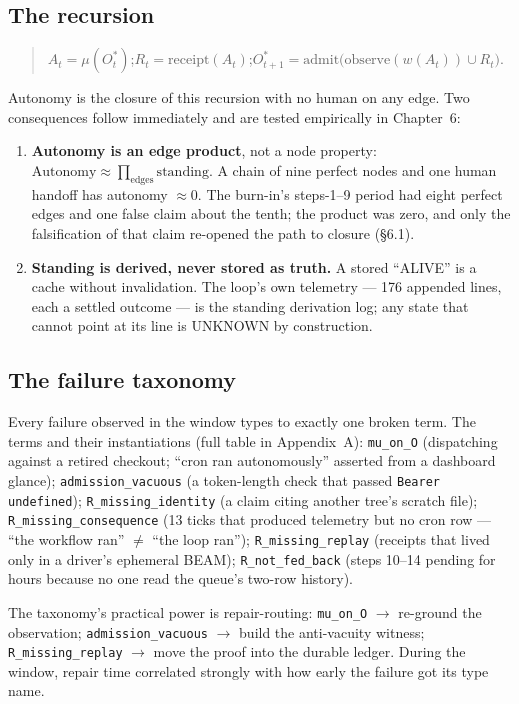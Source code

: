 \documentclass[11pt,a4paper]{article}
\theoremstyle{remark}
\newcommand{\term}[1]{\texttt{#1}}
\begin{document}
\subsection{The recursion}
\begin{quote}
$A_t = \mu(O^{*}_t)$;\qquad $R_t = \mathrm{receipt}(A_t)$;\qquad $O^{*}_{t+1} = \mathrm{admit}\big(\mathrm{observe}(w(A_t)) \cup R_t\big)$.
\end{quote}
Autonomy is the closure of this recursion with no human on any edge. Two consequences follow immediately and are tested empirically in Chapter~6:
\begin{enumerate}
\item \textbf{Autonomy is an edge product}, not a node property: $\mathrm{Autonomy} \approx \prod_{\mathrm{edges}} \mathrm{standing}$. A chain of nine perfect nodes and one human handoff has autonomy $\approx 0$. The burn-in's steps-1--9 period had eight perfect edges and one false claim about the tenth; the product was zero, and only the falsification of that claim re-opened the path to closure (\S6.1).
\item \textbf{Standing is derived, never stored as truth.} A stored ``ALIVE'' is a cache without invalidation. The loop's own telemetry --- 176 appended lines, each a settled outcome --- is the standing derivation log; any state that cannot point at its line is UNKNOWN by construction.
\end{enumerate}

\subsection{The failure taxonomy}
Every failure observed in the window types to exactly one broken term. The terms and their instantiations (full table in Appendix~A): \term{mu\_on\_O} (dispatching against a retired checkout; ``cron ran autonomously'' asserted from a dashboard glance); \term{admission\_vacuous} (a token-length check that passed \term{Bearer undefined}); \term{R\_missing\_identity} (a claim citing another tree's scratch file); \term{R\_missing\_consequence} (13 ticks that produced telemetry but no cron row --- ``the workflow ran'' $\neq$ ``the loop ran''); \term{R\_missing\_replay} (receipts that lived only in a driver's ephemeral BEAM); \term{R\_not\_fed\_back} (steps 10--14 pending for hours because no one read the queue's two-row history).

The taxonomy's practical power is repair-routing: \term{mu\_on\_O} $\to$ re-ground the observation; \term{admission\_vacuous} $\to$ build the anti-vacuity witness; \term{R\_missing\_replay} $\to$ move the proof into the durable ledger. During the window, repair time correlated strongly with how early the failure got its type name.
\end{document}
